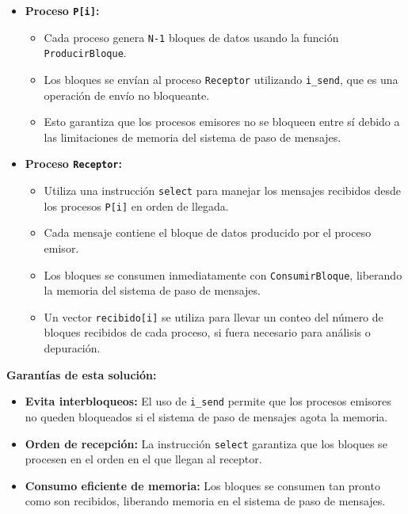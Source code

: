 \documentclass[a4paper,12pt]{article}
\begin{document}
\begin{itemize}
    \item \textbf{Proceso \texttt{P[i]}:} 
    \begin{itemize}
        \item Cada proceso genera \texttt{N-1} bloques de datos usando la función \texttt{ProducirBloque}.
        \item Los bloques se envían al proceso \texttt{Receptor} utilizando \texttt{i\_send}, que es una operación de envío no bloqueante.
        \item Esto garantiza que los procesos emisores no se bloqueen entre sí debido a las limitaciones de memoria del sistema de paso de mensajes.
    \end{itemize}

    \item \textbf{Proceso \texttt{Receptor}:}
    \begin{itemize}
        \item Utiliza una instrucción \texttt{select} para manejar los mensajes recibidos desde los procesos \texttt{P[i]} en orden de llegada.
        \item Cada mensaje contiene el bloque de datos producido por el proceso emisor.
        \item Los bloques se consumen inmediatamente con \texttt{ConsumirBloque}, liberando la memoria del sistema de paso de mensajes.
        \item Un vector \texttt{recibido[i]} se utiliza para llevar un conteo del número de bloques recibidos de cada proceso, si fuera necesario para análisis o depuración.
    \end{itemize}
\end{itemize}

\textbf{Garantías de esta solución:}
\begin{itemize}
    \item \textbf{Evita interbloqueos:} El uso de \texttt{i\_send} permite que los procesos emisores no queden bloqueados si el sistema de paso de mensajes agota la memoria.
    \item \textbf{Orden de recepción:} La instrucción \texttt{select} garantiza que los bloques se procesen en el orden en el que llegan al receptor.
    \item \textbf{Consumo eficiente de memoria:} Los bloques se consumen tan pronto como son recibidos, liberando memoria en el sistema de paso de mensajes.
\end{itemize}
\end{document}
